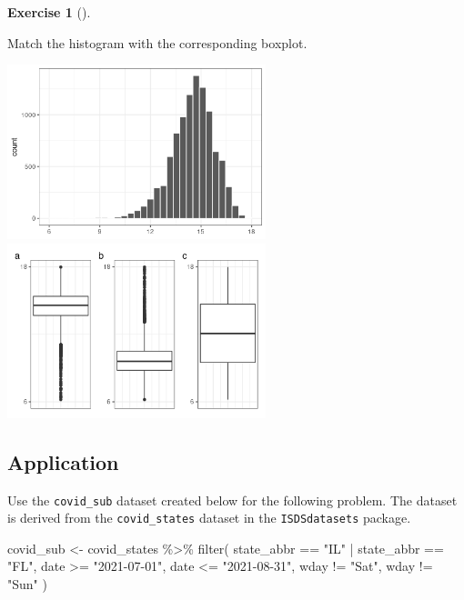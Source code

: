 \documentclass[
  letterpaper,
  DIV=11,
  numbers=noendperiod]{scrreprt}
\newenvironment{Shaded}{\begin{snugshade}}{\end{snugshade}}
\newcommand{\FunctionTok}[1]{\textcolor[rgb]{0.28,0.35,0.67}{#1}}
\newcommand{\NormalTok}[1]{\textcolor[rgb]{0.00,0.23,0.31}{#1}}
\newcommand{\OtherTok}[1]{\textcolor[rgb]{0.00,0.23,0.31}{#1}}
\newcommand{\SpecialCharTok}[1]{\textcolor[rgb]{0.37,0.37,0.37}{#1}}
\newcommand{\StringTok}[1]{\textcolor[rgb]{0.13,0.47,0.30}{#1}}
\theoremstyle{definition}
\newtheorem{exercise}{Exercise}[chapter]
\theoremstyle{remark}
\begin{document}
\leavevmode{}%
\begin{exercise}[]\label{exr-ch02-c12}

Match the histogram with the corresponding boxplot.

\includegraphics[width=\textwidth,height=2in]{images/exercises/ch02_match_hist.png}
\includegraphics[width=\textwidth,height=2in]{images/exercises/ch02_match_box.png}

\end{exercise}

\hypertarget{sec-ex02-application}{%
\subsection{Application}\label{sec-ex02-application}}

Use the \texttt{covid\_sub} dataset created below for the following
problem. The dataset is derived from the \texttt{covid\_states} dataset
in the \texttt{ISDSdatasets} package.

\begin{Shaded}
\begin{Highlighting}[]
\NormalTok{covid\_sub }\OtherTok{\textless{}{-}}\NormalTok{ covid\_states }\SpecialCharTok{\%\textgreater{}\%} 
  \FunctionTok{filter}\NormalTok{(}
\NormalTok{    state\_abbr }\SpecialCharTok{==} \StringTok{"IL"} \SpecialCharTok{|}\NormalTok{ state\_abbr }\SpecialCharTok{==} \StringTok{"FL"}\NormalTok{,}
\NormalTok{    date }\SpecialCharTok{\textgreater{}=} \StringTok{"2021{-}07{-}01"}\NormalTok{, date }\SpecialCharTok{\textless{}=} \StringTok{"2021{-}08{-}31"}\NormalTok{,}
\NormalTok{    wday }\SpecialCharTok{!=} \StringTok{"Sat"}\NormalTok{, wday }\SpecialCharTok{!=} \StringTok{"Sun"}
\NormalTok{    )}
\end{Highlighting}
\end{Shaded}
\end{document}
